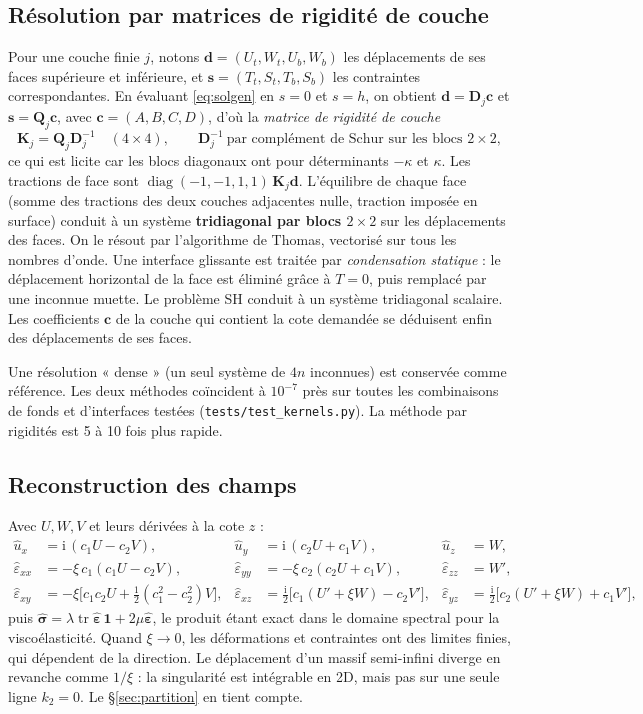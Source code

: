 \documentclass[11pt,a4paper]{article}
\newcommand{\ii}{\mathrm{i}}
\newcommand{\hatt}[1]{\widehat{#1}}
\renewcommand{\epsilon}{\varepsilon}
\begin{document}
\subsection{Résolution par matrices de rigidité de couche}
Pour une couche finie $j$, notons $\bm d=(U_t,W_t,U_b,W_b)$ les déplacements de ses faces
supérieure et inférieure, et $\bm s=(T_t,S_t,T_b,S_b)$ les contraintes correspondantes. En
évaluant \eqref{eq:solgen} en $s=0$ et $s=h$, on obtient $\bm d=\bm D_j\bm c$ et $\bm s=\bm Q_j\bm c$,
avec $\bm c=(A,B,C,D)$, d'où la \emph{matrice de rigidité de couche}
\begin{equation}
\bm K_j=\bm Q_j\bm D_j^{-1}\quad(4\times4),\qquad
\bm D_j^{-1}\ \text{par complément de Schur sur les blocs } 2\times2,
\end{equation}
ce qui est licite car les blocs diagonaux ont pour déterminants $-\kappa$ et $\kappa$. Les
tractions de face sont $\operatorname{diag}(-1,-1,1,1)\,\bm K_j\bm d$. L'équilibre de chaque face
(somme des tractions des deux couches adjacentes nulle, traction imposée en surface) conduit à un
système \textbf{tridiagonal par blocs $2\times2$} sur les déplacements des faces. On le résout par
l'algorithme de Thomas, vectorisé sur tous les nombres d'onde. Une interface glissante est traitée
par \emph{condensation statique} : le déplacement horizontal de la face est éliminé grâce à $T=0$,
puis remplacé par une inconnue muette. Le problème SH conduit à un système tridiagonal scalaire.
Les coefficients $\bm c$ de la couche qui contient la cote demandée se déduisent enfin des
déplacements de ses faces.

Une résolution « dense » (un seul système de $4n$ inconnues) est conservée comme référence. Les
deux méthodes coïncident à $10^{-7}$ près sur toutes les combinaisons de fonds et d'interfaces
testées (\texttt{tests/test\_kernels.py}). La méthode par rigidités est 5 à 10 fois plus rapide.

\subsection{Reconstruction des champs}
Avec $U,W,V$ et leurs dérivées à la cote $z$ :
\begin{align}
\hatt u_x&=\ii\,(c_1U-c_2V), & \hatt u_y&=\ii\,(c_2U+c_1V), & \hatt u_z&=W,\\
\hatt\epsilon_{xx}&=-\xi\,c_1(c_1U-c_2V), & \hatt\epsilon_{yy}&=-\xi\,c_2(c_2U+c_1V), & \hatt\epsilon_{zz}&=W',\\
\hatt\epsilon_{xy}&=-\xi\big[c_1c_2U+\tfrac12(c_1^2-c_2^2)V\big], &
\hatt\epsilon_{xz}&=\tfrac{\ii}{2}\big[c_1(U'+\xi W)-c_2V'\big], &
\hatt\epsilon_{yz}&=\tfrac{\ii}{2}\big[c_2(U'+\xi W)+c_1V'\big],
\end{align}
puis $\hatt{\bm\sigma}=\lambda\operatorname{tr}\hatt{\bm\epsilon}\,\bm1+2\mu\hatt{\bm\epsilon}$,
le produit étant exact dans le domaine spectral pour la viscoélasticité. Quand $\xi\to0$, les
déformations et contraintes ont des limites finies, qui dépendent de la direction. Le déplacement
d'un massif semi-infini diverge en revanche comme $1/\xi$ : la singularité est intégrable en 2D,
mais pas sur une seule ligne $k_2=0$. Le \S\ref{sec:partition} en tient compte.
\end{document}
